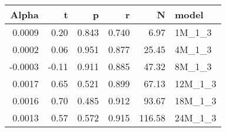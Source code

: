 \begin{table}[ht]
\centering
\begin{tabular}{rrrrrl}
  \hline
Alpha & t & p & r & N & model \\ 
  \hline
0.0009 & 0.20 & 0.843 & 0.740 & 6.97 & 1M\_1\_3 \\ 
  0.0002 & 0.06 & 0.951 & 0.877 & 25.45 & 4M\_1\_3 \\ 
  -0.0003 & -0.11 & 0.911 & 0.885 & 47.32 & 8M\_1\_3 \\ 
  0.0017 & 0.65 & 0.521 & 0.899 & 67.13 & 12M\_1\_3 \\ 
  0.0016 & 0.70 & 0.485 & 0.912 & 93.67 & 18M\_1\_3 \\ 
  0.0013 & 0.57 & 0.572 & 0.915 & 116.58 & 24M\_1\_3 \\ 
   \hline
\end{tabular}
\end{table}

